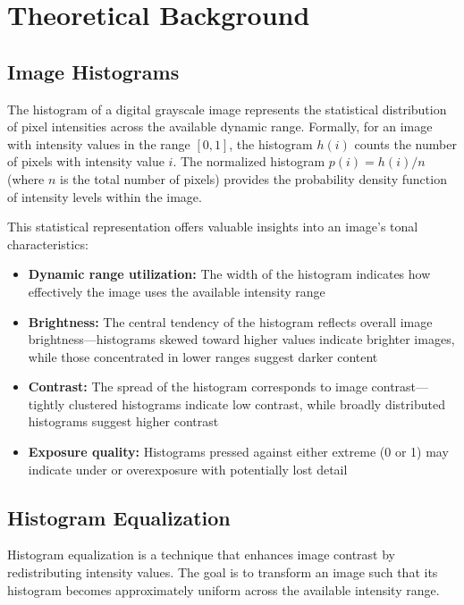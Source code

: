 \documentclass[12pt,a4paper]{article}
\begin{document}
\section{Theoretical Background}

\subsection{Image Histograms}

The histogram of a digital grayscale image represents the statistical distribution of pixel intensities across the available dynamic range. Formally, for an image with intensity values in the range $[0,1]$, the histogram $h(i)$ counts the number of pixels with intensity value $i$. The normalized histogram $p(i) = h(i)/n$ (where $n$ is the total number of pixels) provides the probability density function of intensity levels within the image.

This statistical representation offers valuable insights into an image's tonal characteristics:
\begin{itemize}
    \item \textbf{Dynamic range utilization:} The width of the histogram indicates how effectively the image uses the available intensity range
    \item \textbf{Brightness:} The central tendency of the histogram reflects overall image brightness—histograms skewed toward higher values indicate brighter images, while those concentrated in lower ranges suggest darker content
    \item \textbf{Contrast:} The spread of the histogram corresponds to image contrast—tightly clustered histograms indicate low contrast, while broadly distributed histograms suggest higher contrast
    \item \textbf{Exposure quality:} Histograms pressed against either extreme (0 or 1) may indicate under or overexposure with potentially lost detail
\end{itemize}



\subsection{Histogram Equalization}
\label{subsec:histogram_equalization}

Histogram equalization is a technique that enhances image contrast by redistributing intensity values. The goal is to transform an image such that its histogram becomes approximately uniform across the available intensity range.
\end{document}
